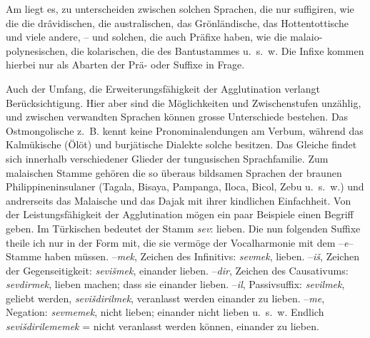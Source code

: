 \largerpage[-1]\label{IV.III.II.4.8a} Am  liegt es, zu unterscheiden zwischen solchen Sprachen, die nur suffigiren, wie die  die drâvidischen, die australischen, das Grönländische, das Hottentottische und viele andere, – und solchen, die auch Präfixe haben, wie die malaio-polynesischen, die kolarischen, die des Bantustammes u.~s.~w. Die Infixe kommen hierbei nur als Abarten der Prä- oder Suffixe in Frage.

\label{IV.III.II.4.8b} Auch der Umfang, die Erweiterungsfähigkeit der Agglutination verlangt Berücksichtigung. Hier aber sind die Möglichkeiten und \label{fp.332} Zwischenstufen unzählig, und zwischen verwandten Sprachen können grosse Unterschiede bestehen. Das Ostmongolische z.~B. kennt keine Pronominalendungen am Verbum, während das Kalmükische (Ölöt) und burjätische Dialekte solche besitzen. Das Gleiche findet sich innerhalb verschiedener Glieder der tungusischen Sprachfamilie. Zum malaischen Stamme gehören die so überaus bildsamen Sprachen der braunen Philippineninsulaner (Tagala, Bisaya, Pampanga, Iloca, Bicol, Zebu u.~s.~w.) und andrerseits das Malaische und das Dajak mit ihrer kindlichen Einfachheit. Von der Leistungsfähigkeit der Agglutination mögen ein paar Beispiele einen Begriff geben. Im Türkischen bedeutet der Stamm \textit{sev}: lieben. Die nun folgenden Suffixe theile ich nur in der Form mit, die sie vermöge der Vocalharmonie mit dem –\textit{e}–Stamme haben müssen. –\textit{mek}, Zeichen des Infinitivs: \textit{sevmek}, lieben. –\textit{iš}, Zeichen der \label{fp.201} Gegenseitigkeit: \textit{sevišmek}, einander lieben. –\textit{dir}, Zeichen des Causativums: \textit{sevdirmek}, lieben machen;   dass sie einander lieben. –\textit{il}, Passivsuffix: \textit{sevilmek}, geliebt werden, \textit{sevišdirilmek}, veranlasst werden einander zu lieben. –\textit{me}, Negation: \textit{sevmemek}, nicht lieben;   einander nicht lieben u.~s.~w. Endlich \textit{sevišdirilememek} = nicht veranlasst werden können, einander zu lieben. 


